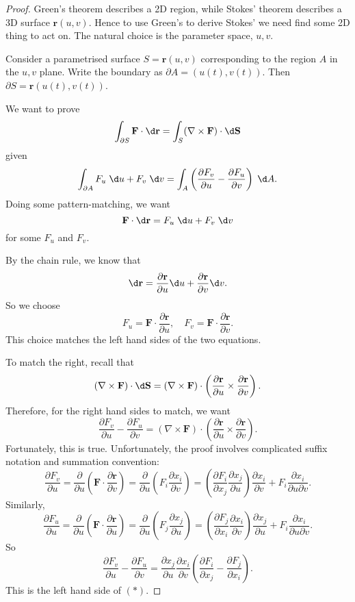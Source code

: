 \documentclass[a4paper]{article}
\begin{document}
\begin{proof}
  Green's theorem describes a 2D region, while Stokes' theorem describes a 3D surface $\mathbf{r}(u, v)$. Hence to use Green's to derive Stokes' we need find some 2D thing to act on. The natural choice is the parameter space, $u, v$.

  Consider a parametrised surface $S = \mathbf{r}(u, v)$ corresponding to the region $A$ in the $u, v$ plane. Write the boundary as $\partial A = (u(t), v(t))$. Then $\partial S = \mathbf{r}(u(t), v(t))$.

  We want to prove
  \[
    \int_{\partial S}\mathbf{F}\cdot \d \mathbf{r} = \int_S (\nabla \times \mathbf{F})\cdot \d \mathbf{S}
  \]
  given
  \[
    \int_{\partial A} F_u\;\d u + F_v\;\d v = \int_A\left(\frac{\partial F_v}{\partial u} - \frac{\partial F_u}{\partial v}\right)\;\d A.
  \]
  Doing some pattern-matching, we want
  \[
    \mathbf{F}\cdot \d \mathbf{r} = F_u \;\d u + F_v \;\d v
  \]
  for some $F_u$ and $F_v$.

  By the chain rule, we know that
  \[
    \d \mathbf{r} = \frac{\partial \mathbf{r}}{\partial u} \d u + \frac{\partial \mathbf{r}}{\partial v}\d v.
  \]
  So we choose
  \[
    F_u = \mathbf{F}\cdot \frac{\partial \mathbf{r}}{\partial u}, \quad F_v = \mathbf{F}\cdot\frac{\partial \mathbf{r}}{\partial v}.
  \]
  This choice matches the left hand sides of the two equations.

  To match the right, recall that
  \[
    (\nabla\times \mathbf{F}) \cdot \d \mathbf{S} = (\nabla\times \mathbf{F})\cdot \left(\frac{\partial \mathbf{r}}{\partial u}\times \frac{\partial \mathbf{r}}{\partial v}\right).
  \]
  Therefore, for the right hand sides to match, we want
  \[
    \frac{\partial F_v}{\partial u} - \frac{\partial F_u}{\partial v} = (\nabla\times \mathbf{F})\cdot \left(\frac{\partial \mathbf{r}}{\partial u}\times \frac{\partial \mathbf{r}}{\partial v}\right).\tag{*}
  \]
  Fortunately, this is true. Unfortunately, the proof involves complicated suffix notation and summation convention:
  \[
    \frac{\partial F_v}{\partial u} = \frac{\partial}{\partial u}\left(\mathbf{F}\cdot \frac{\partial \mathbf{r}}{\partial v}\right) = \frac{\partial}{\partial u}\left(F_i\frac{\partial x_i}{\partial v}\right) = \left(\frac{\partial F_i}{\partial x_j}\frac{\partial x_j}{\partial u}\right)\frac{\partial x_i}{\partial v} + F_i\frac{\partial x_i}{\partial u\partial v}.
  \]
  Similarly,
  \[
    \frac{\partial F_u}{\partial u} = \frac{\partial}{\partial u}\left(\mathbf{F}\cdot \frac{\partial \mathbf{r}}{\partial u}\right) = \frac{\partial}{\partial u}\left(F_j\frac{\partial x_j}{\partial u}\right) = \left(\frac{\partial F_j}{\partial x_i}\frac{\partial x_i}{\partial v}\right)\frac{\partial x_j}{\partial u} + F_i\frac{\partial x_i}{\partial u\partial v}.
  \]
  So
  \[
    \frac{\partial F_v}{\partial u} - \frac{\partial F_u}{\partial v} = \frac{\partial x_j}{\partial u}\frac{\partial x_i}{\partial v}\left(\frac{\partial F_i}{\partial x_j} - \frac{\partial F_j}{\partial x_i}\right).
  \]
  This is the left hand side of $(*)$.


\end{proof}
\end{document}
